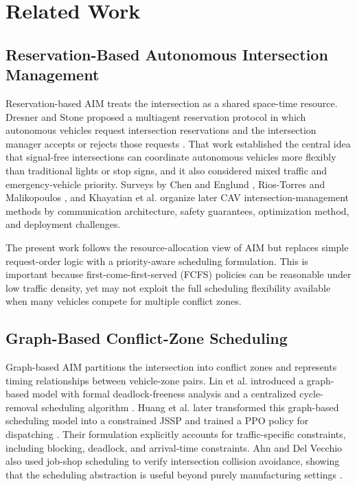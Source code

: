 \section{Related Work}

\subsection{Reservation-Based Autonomous Intersection Management}

Reservation-based AIM treats the intersection as a shared space-time resource. Dresner and Stone proposed a multiagent reservation protocol in which autonomous vehicles request intersection reservations and the intersection manager accepts or rejects those requests \cite{dresner2008multiagent}. That work established the central idea that signal-free intersections can coordinate autonomous vehicles more flexibly than traditional lights or stop signs, and it also considered mixed traffic and emergency-vehicle priority. Surveys by Chen and Englund \cite{chen2016cooperative}, Rios-Torres and Malikopoulos \cite{riosTorres2017survey}, and Khayatian et al. \cite{khayatian2020survey} organize later CAV intersection-management methods by communication architecture, safety guarantees, optimization method, and deployment challenges.

The present work follows the resource-allocation view of AIM but replaces simple request-order logic with a priority-aware scheduling formulation. This is important because first-come-first-served (FCFS) policies can be reasonable under low traffic density, yet may not exploit the full scheduling flexibility available when many vehicles compete for multiple conflict zones.

\subsection{Graph-Based Conflict-Zone Scheduling}

Graph-based AIM partitions the intersection into conflict zones and represents timing relationships between vehicle-zone pairs. Lin et al. introduced a graph-based model with formal deadlock-freeness analysis and a centralized cycle-removal scheduling algorithm \cite{lin2019graph}. Huang et al. later transformed this graph-based scheduling model into a constrained JSSP and trained a PPO policy for dispatching \cite{huang2023reinforcement}. Their formulation explicitly accounts for traffic-specific constraints, including blocking, deadlock, and arrival-time constraints. Ahn and Del Vecchio also used job-shop scheduling to verify intersection collision avoidance, showing that the scheduling abstraction is useful beyond purely manufacturing settings \cite{ahn2016semi}.

